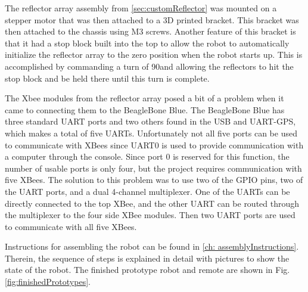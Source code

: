 \vspace*{12pt}
\noindent
The reflector array assembly from \autoref{sec:customReflector} was mounted on a stepper motor that was then attached to a 3D printed bracket. This bracket was then attached to the chassis using M3 screws. Another feature of this bracket is that it had a stop block built into the top  to allow the robot to automatically initialize the reflector array to the zero position when the robot starts up. This is accomplished by commanding a turn of 90\textdegree and allowing the reflectors to hit the stop block and be held there until this turn is complete.

\vspace*{12pt}
\noindent
The Xbee modules from the reflector array posed a bit of a problem when it came to connecting them to the BeagleBone Blue. The BeagleBone Blue has three standard UART ports and two others found in the USB and UART-GPS, which makes a total of five UARTs. Unfortunately not all five ports can be used to communicate with XBees since UART0 is used to provide communication with a computer through the console. Since port 0 is reserved for this function, the number of usable ports is only four, but the project requires communication with five XBees. The solution to this problem was to use two of the GPIO pins, two of the UART ports, and a dual 4-channel multiplexer. One of the UARTs can be directly connected to the top XBee, and the other UART can be routed through the multiplexer to the four side XBee modules. Then two UART ports are used to communicate with all five XBees.

\vspace*{12pt}
\noindent
Instructions for assembling the robot can be found in \autoref{ch: assemblyInstructions}. Therein, the sequence of steps is explained in detail with pictures to show the state of the robot. The finished prototype robot and remote are shown in Fig. \ref{fig:finishedPrototypes}.

